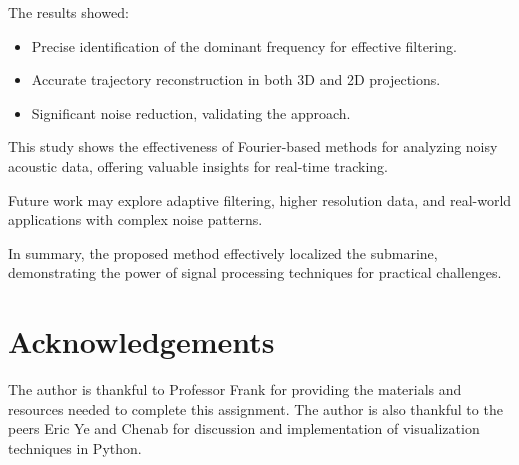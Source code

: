 \documentclass[11pt]{amsart}
\begin{document}
The results showed:
\begin{itemize}
\item Precise identification of the dominant frequency for effective filtering.
\item Accurate trajectory reconstruction in both 3D and 2D projections.
\item Significant noise reduction, validating the approach.
\end{itemize}

This study shows the effectiveness of Fourier-based methods for analyzing noisy acoustic data, offering valuable insights for real-time tracking.

Future work may explore adaptive filtering, higher resolution data, and real-world applications with complex noise patterns.

In summary, the proposed method effectively localized the submarine, demonstrating the power of signal processing techniques for practical challenges.



\section*{Acknowledgements}
The author is thankful to Professor Frank for providing the materials and resources needed to complete this assignment. The author is also thankful to the peers Eric Ye and Chenab for discussion and implementation of visualization techniques in Python.


\end{document}
